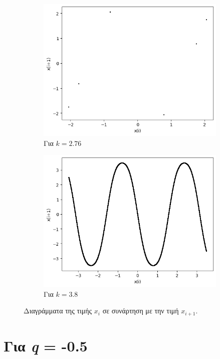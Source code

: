 \begin{figure}[ht]
\begin{subfigure}[b]{0.4\textwidth}
		\includegraphics[width=\textwidth]{LateX images/sine q=-0.3/g7}
		\caption{Για $k=2.76$}
		\label{f:k120}
	\end{subfigure}
	\hfill
	\begin{subfigure}[b]{0.4\textwidth}
		\centering
		\includegraphics[width=\textwidth]{LateX images/sine q=-0.3/g20}
		\caption{Για $k=3.8$}
		\label{f:k126}
	\end{subfigure}
	\hfill		
	\caption{Διαγράμματα της τιμής \(x_i\) σε συνάρτηση με την τιμή \(x_{i+1}\).}
	\label{f:k246}
\end{figure}

\clearpage 
\section{Για \emph{q} = -0.5}

